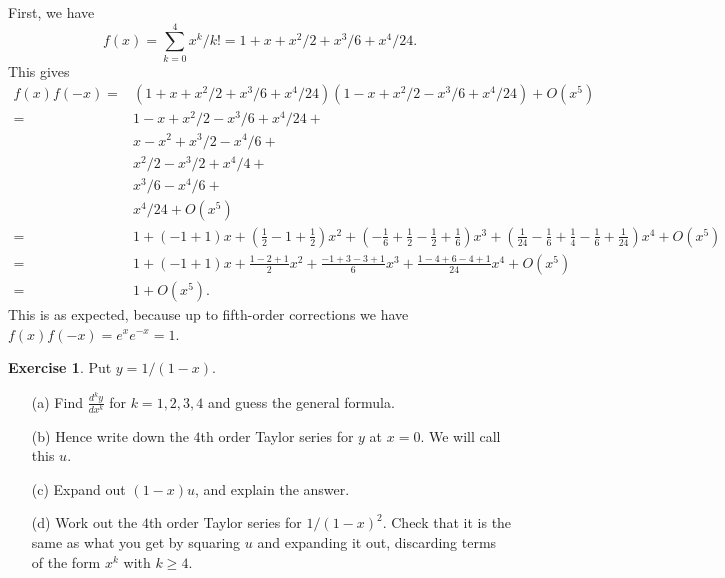 \documentclass[a4paper]{amsart}
\theoremstyle{definition}
\newtheorem{exercise}{Exercise}[section]
\newenvironment{solution}{{\noindent \bf Solution:}}{}
\begin{document}
\begin{solution}
First, we have
 \[ f(x) = \sum_{k=0}^4 x^k/k! =
     1 + x + x^2/2 + x^3/6 + x^4/24.
 \]
 This gives
 \begin{align*}
  f(x)f(-x) =& 
   (1 + x + x^2/2 + x^3/6 + x^4/24)
   (1 - x + x^2/2 - x^3/6 + x^4/24) + O(x^5)\\
  =& 1 - x   + x^2/2 - x^3/6 + x^4/24 + \\
   & x - x^2 + x^3/2 - x^4/6 + \\ 
   & x^2/2 - x^3/2 + x^4/4 + \\
   & x^3/6 - x^4/6 + \\
   & x^4/24 + O(x^5)\\
  =& 1 + (-1+1)x +
     (\tfrac{1}{2} - 1 + \tfrac{1}{2})x^2 +
     (-\tfrac{1}{6}+\tfrac{1}{2}-\tfrac{1}{2}+\tfrac{1}{6})x^3 +
     (\tfrac{1}{24}-\tfrac{1}{6}+\tfrac{1}{4}-\tfrac{1}{6}+\tfrac{1}{24})x^4 +
     O(x^5) \\
  =& 1 + (-1+1)x +
     \tfrac{1-2+1}{2} x^2 +
     \tfrac{-1+3-3+1}{6} x^3 +
     \tfrac{1-4+6-4+1}{24} x^4 +
     O(x^5) \\
  =& 1 + O(x^5).
 \end{align*}
 This is as expected, because up to fifth-order corrections
 we have $f(x)f(-x)=e^xe^{-x}=1$.
\end{solution}
\begin{exercise}\label{ex-taylor-gp}
Put $y=1/(1-x)$.  
 \begin{itemize}
  \item[(a)] Find $\frac{d^ky}{dx^k}$
   for $k=1,2,3,4$ and guess the general formula.
  \item[(b)] Hence write down the $4$th order Taylor series
   for $y$ at $x=0$.  We will call this $u$.
  \item[(c)] Expand out $(1-x)u$, and explain the answer.
  \item[(d)] Work out the $4$th order Taylor series for
   $1/(1-x)^2$.  Check that it is the same as what you get
   by squaring $u$ and expanding it out, discarding terms of
   the form $x^k$ with $k\geq 4$.
 \end{itemize}
\end{exercise}
\end{document}
